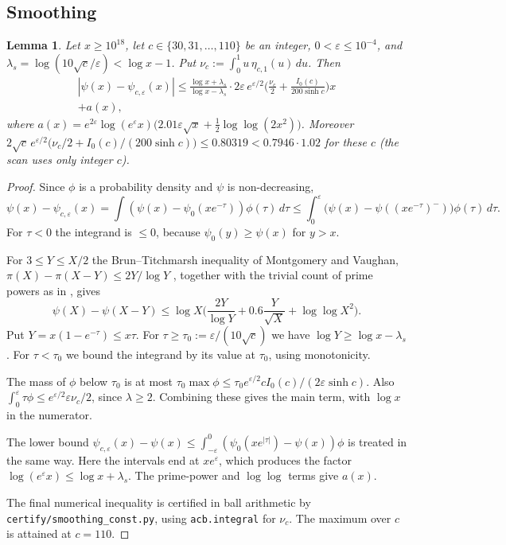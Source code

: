 \documentclass[11pt]{amsart}
\numberwithin{equation}{section}
\newtheorem{lemma}[theorem]{Lemma}
\theoremstyle{definition}
\theoremstyle{remark}
\newcommand{\eps}{\varepsilon}
\newcommand{\code}[1]{\texttt{#1}}
\begin{document}
\subsection{Smoothing}
\begin{lemma}\label{lem:smooth}
Let $x \ge 10^{18}$, let $c\in\{30,31,\dots,110\}$ be an integer, $0 < \eps \le 10^{-4}$, and $\lambda_s = \log(10\sqrt c/\eps) < \log x - 1$.
Put $\nu_c := \int_0^1 u\,\eta_{c,1}(u)\,du$. Then
\begin{multline*}
|\psi(x) - \psi_{c,\eps}(x)| \le \frac{\log x + \lambda_s}{\log x - \lambda_s}\cdot 2\eps\, e^{\eps/2}\Big(\frac{\nu_c}{2} + \frac{I_0(c)}{200\sinh c}\Big)x \\ + a(x),
\end{multline*}
where $a(x) = e^{2\eps}\log(e^{\eps}x)\big(2.01\eps\sqrt x + \tfrac12\log\log(2x^2)\big)$.
Moreover $2\sqrt c\,e^{\eps/2}\big(\nu_c/2 + I_0(c)/(200\sinh c)\big) \le 0.80319 < 0.7946\cdot 1.02$ for these $c$ (the scan uses only integer $c$).
\end{lemma}

\begin{proof}
Since $\phi$ is a probability density and $\psi$ is non-decreasing,
\[
\psi(x) - \psi_{c,\eps}(x) = \int (\psi(x) - \psi_0(xe^{-\tau}))\phi(\tau)\,d\tau \le \int_0^{\eps}\big(\psi(x) - \psi((xe^{-\tau})^-)\big)\phi(\tau)\,d\tau .
\]
For $\tau < 0$ the integrand is $\le 0$, because $\psi_0(y) \ge \psi(x)$ for $y > x$.

For $3 \le Y \le X/2$ the Brun--Titchmarsh inequality of Montgomery and Vaughan, $\pi(X)-\pi(X-Y) \le 2Y/\log Y$ \cite{MV73}, together with the trivial count of prime powers as in \cite[(3.9)]{Buthe2018}, gives
\[
\psi(X) - \psi(X - Y) \le \log X\Big(\frac{2Y}{\log Y} + 0.6\frac{Y}{\sqrt X} + \log\log X^2\Big).
\]
Put $Y = x(1-e^{-\tau}) \le x\tau$.
For $\tau \ge \tau_0 := \eps/(10\sqrt c)$ we have $\log Y \ge \log x - \lambda_s$.
For $\tau < \tau_0$ we bound the integrand by its value at $\tau_0$, using monotonicity.

The mass of $\phi$ below $\tau_0$ is at most $\tau_0\max\phi \le \tau_0 e^{\eps/2}c I_0(c)/(2\eps\sinh c)$.
Also $\int_0^\eps\tau\phi \le e^{\eps/2}\eps\nu_c/2$, since $\lambda \ge 2$.
Combining these gives the main term, with $\log x$ in the numerator.

The lower bound $\psi_{c,\eps}(x) - \psi(x) \le \int_{-\eps}^0 (\psi_0(xe^{|\tau|}) - \psi(x))\phi$ is treated in the same way.
Here the intervals end at $xe^{\eps}$, which produces the factor $\log(e^\eps x) \le \log x + \lambda_s$.
The prime-power and $\log\log$ terms give $a(x)$.

The final numerical inequality is certified in ball arithmetic by \code{certify/smoothing\_const.py}, using \code{acb.integral} for $\nu_c$.
The maximum over $c$ is attained at $c = 110$.
\end{proof}
\end{document}

